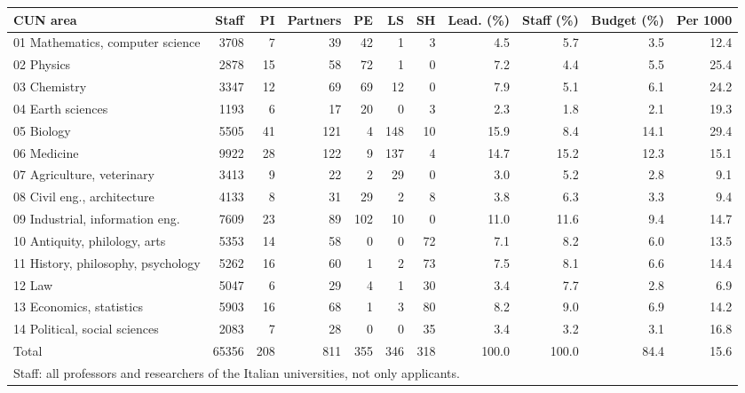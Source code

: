 \documentclass[11pt,a4paper]{article}
\begin{document}
\begin{table}[H]
\centering
\scriptsize\setlength{\tabcolsep}{2.5pt}
\begin{tabular}{lrrrrrrrrrr}
\toprule
CUN area & Staff & PI & Partners & PE & LS & SH & Lead. (\%) & Staff (\%) & Budget (\%) & Per 1000 \\
\midrule
01 Mathematics, computer science & 3708 & 7 & 39 & 42 & 1 & 3 & 4.5 & 5.7 & 3.5 & 12.4 \\
02 Physics & 2878 & 15 & 58 & 72 & 1 & 0 & 7.2 & 4.4 & 5.5 & 25.4 \\
03 Chemistry & 3347 & 12 & 69 & 69 & 12 & 0 & 7.9 & 5.1 & 6.1 & 24.2 \\
04 Earth sciences & 1193 & 6 & 17 & 20 & 0 & 3 & 2.3 & 1.8 & 2.1 & 19.3 \\
05 Biology & 5505 & 41 & 121 & 4 & 148 & 10 & 15.9 & 8.4 & 14.1 & 29.4 \\
06 Medicine & 9922 & 28 & 122 & 9 & 137 & 4 & 14.7 & 15.2 & 12.3 & 15.1 \\
07 Agriculture, veterinary & 3413 & 9 & 22 & 2 & 29 & 0 & 3.0 & 5.2 & 2.8 & 9.1 \\
08 Civil eng., architecture & 4133 & 8 & 31 & 29 & 2 & 8 & 3.8 & 6.3 & 3.3 & 9.4 \\
09 Industrial, information eng. & 7609 & 23 & 89 & 102 & 10 & 0 & 11.0 & 11.6 & 9.4 & 14.7 \\
10 Antiquity, philology, arts & 5353 & 14 & 58 & 0 & 0 & 72 & 7.1 & 8.2 & 6.0 & 13.5 \\
11 History, philosophy, psychology & 5262 & 16 & 60 & 1 & 2 & 73 & 7.5 & 8.1 & 6.6 & 14.4 \\
12 Law & 5047 & 6 & 29 & 4 & 1 & 30 & 3.4 & 7.7 & 2.8 & 6.9 \\
13 Economics, statistics & 5903 & 16 & 68 & 1 & 3 & 80 & 8.2 & 9.0 & 6.9 & 14.2 \\
14 Political, social sciences & 2083 & 7 & 28 & 0 & 0 & 35 & 3.4 & 3.2 & 3.1 & 16.8 \\
\midrule
Total & 65356 & 208 & 811 & 355 & 346 & 318 & 100.0 & 100.0 & 84.4 & 15.6 \\
\bottomrule
\multicolumn{11}{l}{\footnotesize Staff: all professors and researchers of the Italian universities, not only applicants.} \\
\end{tabular}
\end{table}
\end{document}
